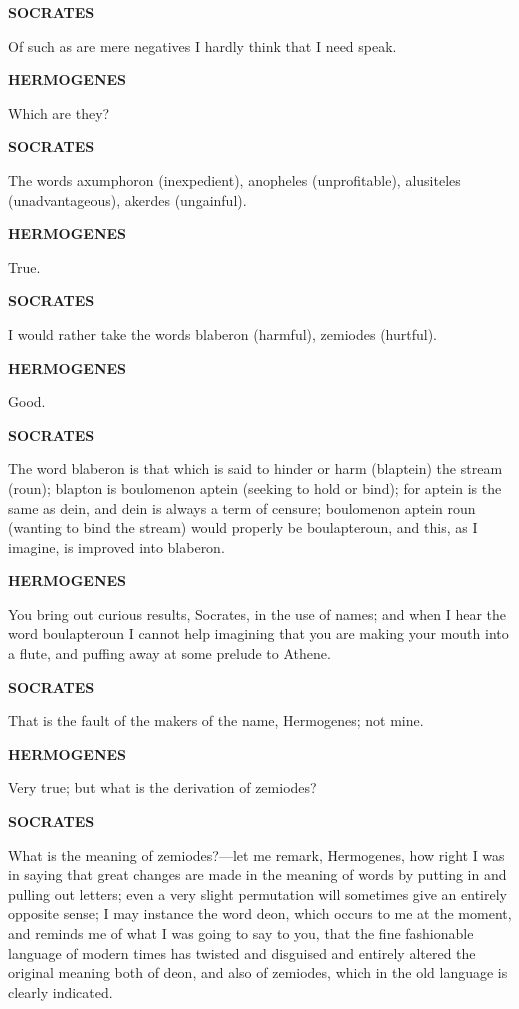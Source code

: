 \documentclass[11pt,letter]{article}
\begin{document}
\par \textbf{SOCRATES}
\par   Of such as are mere negatives I hardly think that I need speak.

\par \textbf{HERMOGENES}
\par   Which are they?

\par \textbf{SOCRATES}
\par   The words axumphoron (inexpedient), anopheles (unprofitable), alusiteles (unadvantageous), akerdes (ungainful).

\par \textbf{HERMOGENES}
\par   True.

\par \textbf{SOCRATES}
\par   I would rather take the words blaberon (harmful), zemiodes (hurtful).

\par \textbf{HERMOGENES}
\par   Good.

\par \textbf{SOCRATES}
\par   The word blaberon is that which is said to hinder or harm (blaptein) the stream (roun); blapton is boulomenon aptein (seeking to hold or bind); for aptein is the same as dein, and dein is always a term of censure; boulomenon aptein roun (wanting to bind the stream) would properly be boulapteroun, and this, as I imagine, is improved into blaberon.

\par \textbf{HERMOGENES}
\par   You bring out curious results, Socrates, in the use of names; and when I hear the word boulapteroun I cannot help imagining that you are making your mouth into a flute, and puffing away at some prelude to Athene.

\par \textbf{SOCRATES}
\par   That is the fault of the makers of the name, Hermogenes; not mine.

\par \textbf{HERMOGENES}
\par   Very true; but what is the derivation of zemiodes?

\par \textbf{SOCRATES}
\par   What is the meaning of zemiodes?—let me remark, Hermogenes, how right I was in saying that great changes are made in the meaning of words by putting in and pulling out letters; even a very slight permutation will sometimes give an entirely opposite sense; I may instance the word deon, which occurs to me at the moment, and reminds me of what I was going to say to you, that the fine fashionable language of modern times has twisted and disguised and entirely altered the original meaning both of deon, and also of zemiodes, which in the old language is clearly indicated.
\end{document}
